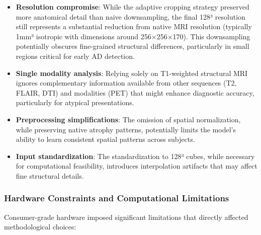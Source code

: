 \documentclass[12pt, a4paper]{article}
\begin{document}
\begin{itemize}
    \item \textbf{Resolution compromise}: While the adaptive cropping strategy preserved more anatomical detail than naive downsampling, the final 128³ resolution still represents a substantial reduction from native MRI resolution (typically 1mm³ isotropic with dimensions around 256×256×170). This downsampling potentially obscures fine-grained structural differences, particularly in small regions critical for early AD detection.
    
    \item \textbf{Single modality analysis}: Relying solely on T1-weighted structural MRI ignores complementary information available from other sequences (T2, FLAIR, DTI) and modalities (PET) that might enhance diagnostic accuracy, particularly for atypical presentations.
    
    \item \textbf{Preprocessing simplifications}: The omission of spatial normalization, while preserving native atrophy patterns, potentially limits the model's ability to learn consistent spatial patterns across subjects.
    
    \item \textbf{Input standardization}: The standardization to 128³ cubes, while necessary for computational feasibility, introduces interpolation artifacts that may affect fine structural details.
\end{itemize}

\subsubsection{Hardware Constraints and Computational Limitations}

Consumer-grade hardware imposed significant limitations that directly affected methodological choices:
\end{document}
